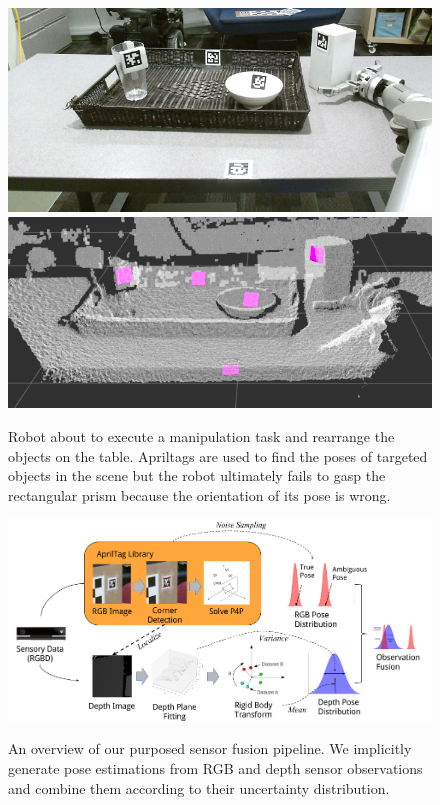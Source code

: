 \begin{figure}
\centering
\includegraphics[width=\columnwidth]{figs/table_clearing_rgb_small} \\
\includegraphics[width=\columnwidth]{figs/table_clearing_depth}
\caption{Robot about to execute a manipulation task and rearrange the objects on the table. Apriltags are used to find the poses of targeted objects in the scene but the robot ultimately fails to gasp the rectangular prism because the orientation of its pose is wrong.}
\label{fig:table_clearing}
\end{figure}

\begin{figure}
\includegraphics[width=\columnwidth]{figs/pipeline} \\
\caption{An overview of our purposed sensor fusion pipeline. We implicitly generate pose estimations from RGB and depth sensor observations and combine them according to their uncertainty distribution.}
\label{fig:pipeline}
\end{figure}

